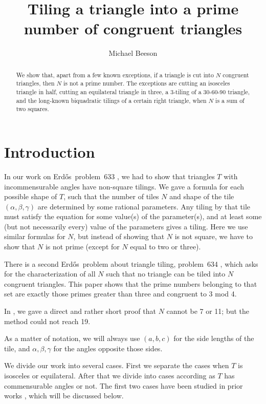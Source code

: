 \documentclass{amsart}
\title{Tiling a triangle into a prime number of congruent triangles}
\author[Beeson]{Michael Beeson}
\def\Erdos{Erd\H{o}s}
\theoremstyle{plain}
\theoremstyle{definition}
\theoremstyle{remark}
\begin{document}
\begin{abstract}
We show that, apart from a few known exceptions,  if a triangle is 
cut into $N$ congruent triangles, then $N$ is not a prime number.  
The exceptions are cutting an isosceles triangle in half, cutting
an equilateral triangle in three, a 3-tiling of a 30-60-90 triangle,
and the long-known biquadratic tilings
of a certain right triangle, when $N$ is a sum of two squares.
\end{abstract}
\maketitle


\section{Introduction}

In our work on \Erdos\ problem~633 \cite{erdos-633, BLZ2026}, we had to show that triangles $T$ with 
incommensurable angles have non-square tilings.  We gave a formula for each 
possible shape of $T$, such that the
number of tiles $N$ and shape of the tile $(\alpha,\beta,\gamma)$ are 
determined by some rational parameters.  Any tiling by that tile must
satisfy the equation for some value(s) of the parameter(s), and at least
some (but not necessarily every) value of the parameters gives a tiling.
Here we use similar formulas for $N$, but instead of showing that $N$
is not square, we have to show that $N$ is not prime (except for $N$ equal to two or three).

There is a second \Erdos\ problem about triangle tiling, problem~634 \cite{erdos-634}, 
which asks for the characterization of all $N$ such that no triangle can be tiled into $N$
congruent triangles.  This paper shows that the prime numbers belonging to that set
are exactly those primes greater than three and congruent to 3 mod 4. 

In \cite{beeson-noseven}, we gave a direct and rather short proof that 
$N$ cannot be 7 or 11;  but the method could not reach 19.  

As a matter of notation,  we will always use $(a,b,c)$ for the side lengths
of the tile, and $\alpha,\beta,\gamma$ for the angles opposite those sides.

We divide our work into several  cases.  First we separate the cases when $T$ is
isosceles or equilateral.  After that we divide into cases
 according as $T$ has commensurable angles or not.
 The first two cases have been studied in prior works
 \cite{beeson-isosceles, beeson-isoscelesPrime,beeson-equilateral}, which will be 
 discussed below. 
 
\end{document}
